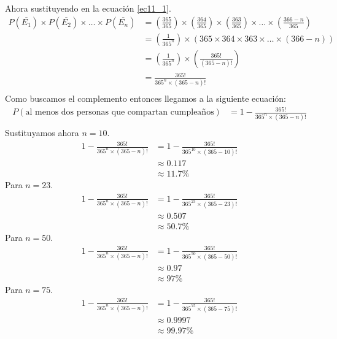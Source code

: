 \documentclass[12pt]{article}
\begin{document}
Ahora sustituyendo en la ecuación \ref{ec11_1}.\\
\begin{equation}\label{ec11_2}
\begin{split}
P(\overline{E_1}) \times P(\overline{E_2}) \times \dots \times P(\overline{E_n}) &=(\frac{365}{365}) \times (\frac{364}{365}) \times (\frac{363}{365}) \times \dots \times (\frac{366 - n}{365}) \\
&=(\frac{1}{365^{n}})\times(365 \times 364 \times 363 \times \dots \times (366 - n))\\
&=(\frac{1}{365^{n}})\times(\frac{365!}{(365-n)!})\\
&=\frac{365!}{365^{n} \times(365-n)!}\\
\end{split}
\end{equation}
Como buscamos el complemento entonces llegamos a la siguiente ecuación:
\begin{equation}\label{ec11_3}
\begin{split}
P(\text{al menos dos personas que compartan cumpleaños})&=1 - \frac{365!}{365^{n} \times(365-n)!}\\
\end{split}
\end{equation}
Sustituyamos ahora $n=10$.
\begin{equation}\label{ec11_4}
\begin{split}
1 - \frac{365!}{365^{n} \times(365-n)!}&=1 - \frac{365!}{365^{10} \times(365-10)!}\\
&\approx 0.117 \\
&\approx 11.7\%
\end{split}
\end{equation}
Para $n=23$.
\begin{equation}
\begin{split}
1 - \frac{365!}{365^{n} \times(365-n)!}&=1 - \frac{365!}{365^{23} \times(365-23)!}\\
&\approx 0.507 \\
&\approx 50.7\%
\end{split}
\end{equation}
Para $n=50$.
\begin{equation}
\begin{split}
1 - \frac{365!}{365^{n} \times(365-n)!}&=1 - \frac{365!}{365^{50} \times(365-50)!}\\
&\approx 0.97 \\
&\approx 97\%
\end{split}
\end{equation}
Para $n=75$.
\begin{equation}
\begin{split}
1 - \frac{365!}{365^{n} \times(365-n)!}&=1 - \frac{365!}{365^{75} \times(365-75)!}\\
&\approx 0.9997 \\
&\approx 99.97\%
\end{split}
\end{equation}
\end{document}
